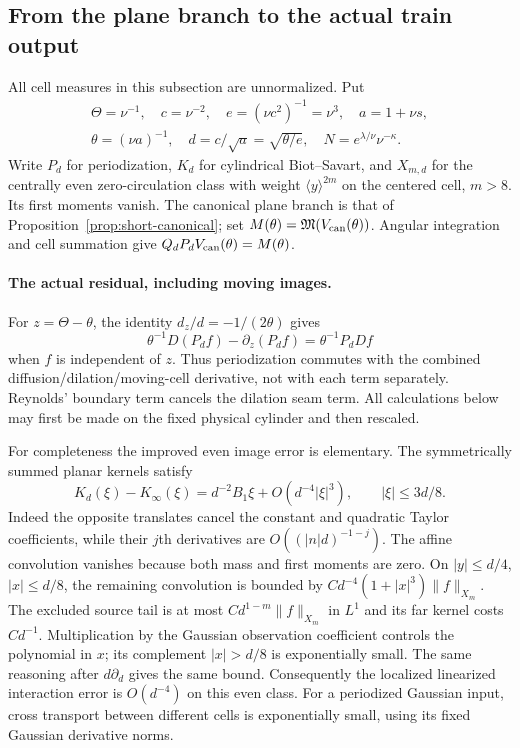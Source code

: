 \subsection{From the plane branch to the actual train output}
\label{sec:canonical-transfer}

All cell measures in this subsection are unnormalized. Put
\[
\begin{gathered}
 \Theta=\nu^{-1},\quad c=\nu^{-2},\quad e=(\nu c^2)^{-1}=\nu^3,\quad
 a=1+\nu s,\\
 \theta=(\nu a)^{-1},\quad d=c/\sqrt a=\sqrt{\theta/e},\quad
 N=e^{\lambda/\nu}\nu^{-\kappa}.
\end{gathered}
\]
Write $P_d$ for periodization, $K_d$ for cylindrical Biot--Savart,
and $X_{m,d}$ for the centrally even zero-circulation class with
weight $\langle y\rangle^{2m}$ on the centered cell, $m>8$.
Its first moments vanish. The canonical plane branch is that of
Proposition~\ref{prop:short-canonical}; set
$M(\theta)=\mathfrak M(V_{\rm can}(\theta))$. Angular integration
and cell summation give $Q_dP_dV_{\rm can}(\theta)=M(\theta)$.

\paragraph{The actual residual, including moving images.}
For $z=\Theta-\theta$, the identity $d_z/d=-1/(2\theta)$ gives
\begin{equation}\label{eq:ct-moving-period}
 \theta^{-1}D(P_df)-\partial_z(P_df)
       =\theta^{-1}P_dDf
\end{equation}
when $f$ is independent of $z$. Thus periodization commutes with
the combined diffusion/dilation/moving-cell derivative, not with
each term separately. Reynolds' boundary term cancels the dilation
seam term. All calculations below may first be made on the fixed
physical cylinder and then rescaled.

For completeness the improved even image error is elementary.
The symmetrically summed planar kernels satisfy
\[
 K_d(\xi)-K_\infty(\xi)
      =d^{-2}B_1\xi+O(d^{-4}|\xi|^3),\qquad |\xi|\le3d/8.
\]
Indeed the opposite translates cancel the constant and quadratic
Taylor coefficients, while their $j$th derivatives are
$O((|n|d)^{-1-j})$. The affine convolution vanishes because both
mass and first moments are zero. On $|y|\le d/4$, $|x|\le d/8$,
the remaining convolution is bounded by
$Cd^{-4}(1+|x|^3)\|f\|_{X_m}$. The excluded source tail is at most
$Cd^{1-m}\|f\|_{X_m}$ in $L^1$ and its far kernel costs $Cd^{-1}$.
Multiplication by the Gaussian observation coefficient controls
the polynomial in $x$; its complement $|x|>d/8$ is exponentially
small. The same reasoning after $d\partial_d$ gives the same bound.
Consequently the localized linearized interaction error is
$O(d^{-4})$ on this even class. For a periodized Gaussian input,
cross transport between different cells is exponentially small,
using its fixed Gaussian derivative norms.

